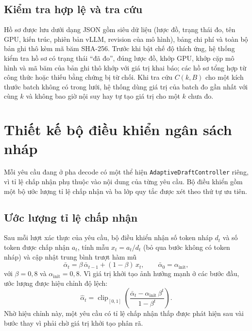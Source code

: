 \subsection{Kiểm tra hợp lệ và tra cứu}

Hồ sơ được lưu dưới dạng JSON gồm siêu dữ liệu (lược đồ, trạng thái đo, tên GPU, kiến trúc, phiên bản vLLM, revision của mô hình), bảng chi phí và toàn bộ bản ghi thô kèm mã băm SHA-256. Trước khi bật chế độ thích ứng, hệ thống kiểm tra hồ sơ có trạng thái ``đã đo'', đúng lược đồ, khớp GPU, khớp cặp mô hình và mã băm của bản ghi thô khớp với giá trị khai báo; các hồ sơ tổng hợp từ công thức hoặc thiếu bằng chứng bị từ chối. Khi tra cứu $C(k, B)$ cho một kích thước batch không có trong lưới, hệ thống dùng giá trị của batch đo gần nhất với cùng $k$ và không bao giờ nội suy hay tự tạo giá trị cho một $k$ chưa đo.

\section{Thiết kế bộ điều khiển ngân sách nháp}
\label{sec:bo-dieu-khien}

Mỗi yêu cầu đang ở pha decode có một thể hiện \texttt{AdaptiveDraftController} riêng, vì tỉ lệ chấp nhận phụ thuộc vào nội dung của từng yêu cầu. Bộ điều khiển gồm một bộ ước lượng tỉ lệ chấp nhận và ba lớp quy tắc được xét theo thứ tự ưu tiên.

\subsection{Ước lượng tỉ lệ chấp nhận}

Sau mỗi lượt xác thực của yêu cầu, bộ điều khiển nhận số token nháp $d_t$ và số token được chấp nhận $a_t$, tính mẫu $x_t = a_t / d_t$ (bỏ qua bước không có token nháp) và cập nhật trung bình trượt hàm mũ
\begin{equation}\label{eq:ema}
  \bar{\alpha}_t = \beta\, \bar{\alpha}_{t-1} + (1-\beta)\, x_t, \qquad \bar{\alpha}_0 = \alpha_{\text{init}},
\end{equation}
với $\beta = 0{,}8$ và $\alpha_{\text{init}} = 0{,}8$. Vì giá trị khởi tạo ảnh hưởng mạnh ở các bước đầu, ước lượng được hiệu chỉnh độ lệch:
\begin{equation}\label{eq:ema-hieu-chinh}
  \hat{\alpha}_t = \operatorname{clip}_{[0,1]}\!\left(\frac{\bar{\alpha}_t - \alpha_{\text{init}}\,\beta^{t}}{1-\beta^{t}}\right).
\end{equation}
Nhờ hiệu chỉnh này, một yêu cầu có tỉ lệ chấp nhận thấp được phát hiện sau vài bước thay vì phải chờ giá trị khởi tạo phân rã.

